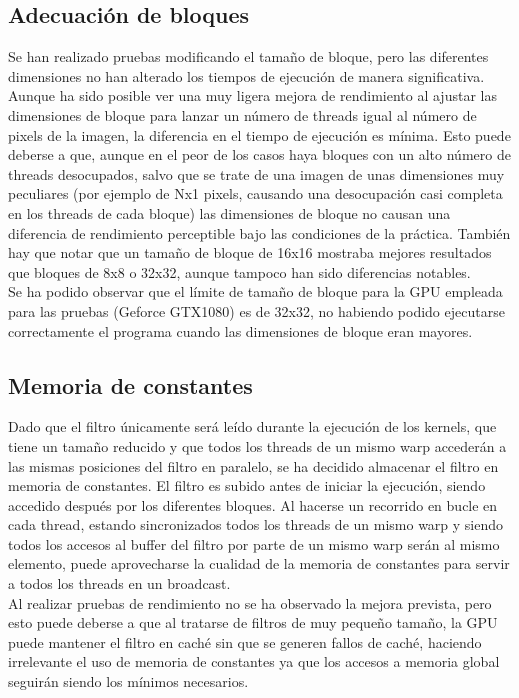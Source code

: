 \documentclass[10pt,oneside,a4paper]{article}
\begin{document}
\subsection{Adecuación de bloques}
Se han realizado pruebas modificando el tamaño de bloque, pero las diferentes dimensiones no han alterado los tiempos de ejecución de manera significativa. Aunque ha sido posible ver una muy ligera mejora de rendimiento al ajustar las dimensiones de bloque para lanzar un número de threads igual al número de pixels de la imagen, la diferencia en el tiempo de ejecución es mínima. Esto puede deberse a que, aunque en el peor de los casos haya bloques con un alto número de threads desocupados, salvo que se trate de una imagen de unas dimensiones muy peculiares (por ejemplo de Nx1 pixels, causando una desocupación casi completa en los threads de cada bloque) las dimensiones de bloque no causan una diferencia de rendimiento perceptible bajo las condiciones de la práctica. También hay que notar que un tamaño de bloque de 16x16 mostraba mejores resultados que bloques de 8x8 o 32x32, aunque tampoco han sido diferencias notables.\\

Se ha podido observar que el límite de tamaño de bloque para la GPU empleada para las pruebas (Geforce GTX1080) es de 32x32, no habiendo podido ejecutarse correctamente el programa cuando las dimensiones de bloque eran mayores.

\subsection{Memoria de constantes}
Dado que el filtro únicamente será leído durante la ejecución de los kernels, que tiene un tamaño reducido y que todos los threads de un mismo warp accederán a las mismas posiciones del filtro en paralelo, se ha decidido almacenar el filtro en memoria de constantes. El filtro es subido antes de iniciar la ejecución, siendo accedido después por los diferentes bloques. Al hacerse un recorrido en bucle en cada thread, estando sincronizados todos los threads de un mismo warp y siendo todos los accesos al buffer del filtro por parte de un mismo warp serán al mismo elemento, puede aprovecharse la cualidad de la memoria de constantes para servir a todos los threads en un broadcast.\\

Al realizar pruebas de rendimiento no se ha observado la mejora prevista, pero esto puede deberse a que al tratarse de filtros de muy pequeño tamaño, la GPU puede mantener el filtro en caché sin que se generen fallos de caché, haciendo irrelevante el uso de memoria de constantes ya que los accesos a memoria global seguirán siendo los mínimos necesarios.
\end{document}
